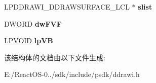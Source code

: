 \begin{DoxyCompactItemize}
\item 
\mbox{\label{struct___d_d_r_a_w_i___d_d_r_a_w_s_u_r_f_a_c_e___m_o_r_e_a678e40661a6b7009e96479e92cb39f42}} 
L\+P\+D\+D\+R\+A\+W\+I\+\_\+\+D\+D\+R\+A\+W\+S\+U\+R\+F\+A\+C\+E\+\_\+\+L\+CL $\ast$ {\bfseries slist}
\item 
\mbox{\label{struct___d_d_r_a_w_i___d_d_r_a_w_s_u_r_f_a_c_e___m_o_r_e_aaff272fdd6df48d570ecc6a9459edc26}} 
D\+W\+O\+RD {\bfseries dw\+F\+VF}
\item 
\mbox{\label{struct___d_d_r_a_w_i___d_d_r_a_w_s_u_r_f_a_c_e___m_o_r_e_a30db6190d6fffc192c08280d0ab3bda0}} 
\hyperlink{interfacevoid}{L\+P\+V\+O\+ID} {\bfseries lp\+VB}
\end{DoxyCompactItemize}


该结构体的文档由以下文件生成\+:\begin{DoxyCompactItemize}
\item 
E\+:/\+React\+O\+S-\/0../sdk/include/psdk/ddrawi.\+h\end{DoxyCompactItemize}
